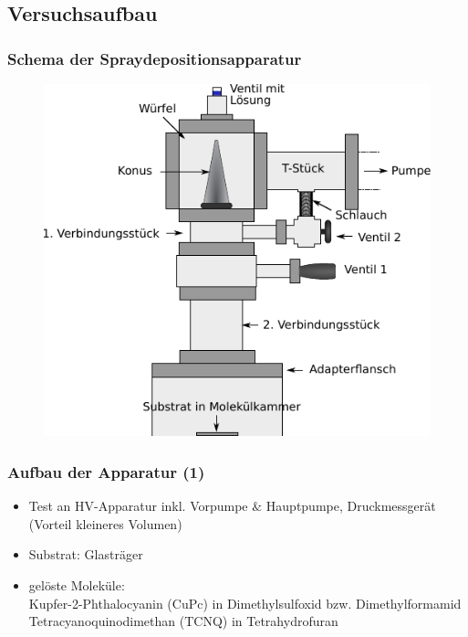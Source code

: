 \documentclass{beamer}
\begin{document}


\subsection[Versuchsaufbau]{Versuchsaufbau}

\begin{frame}
\frametitle{Schema der Spraydepositionsapparatur}
\begin{figure}[H]
\centering
\includegraphics{bilder/wuerfelklein.pdf}
\end{figure}
\end{frame}

\begin{frame}
\frametitle{Aufbau der Apparatur (1)}
\begin{itemize}\setlength{\itemsep}{+15pt}
  \item Test an HV-Apparatur inkl. Vorpumpe $\&$ Hauptpumpe, Druckmessgerät (Vorteil kleineres
  Volumen)
  \item Substrat: Glasträger
  \item gelöste Moleküle: \\
  Kupfer-2-Phthalocyanin (CuPc) in Dimethylsulfoxid bzw. Dimethylformamid\\
  Tetracyanoquinodimethan (TCNQ) in Tetrahydrofuran
\end{itemize}
\end{frame}
\end{document}
